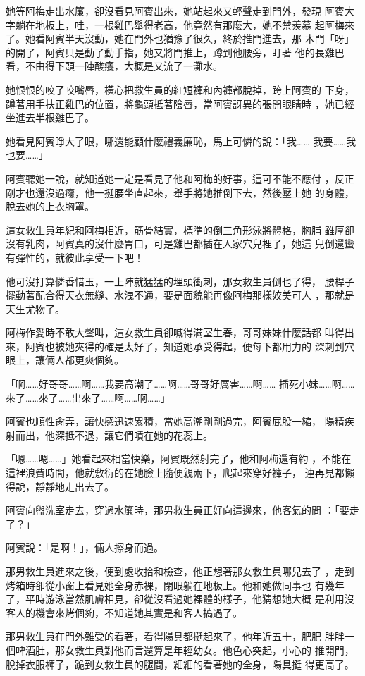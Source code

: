 她等阿梅走出水簾，卻沒看見阿賓出來，她站起來又輕聲走到門外，發現
阿賓大字躺在地板上，哇，一根雞巴舉得老高，他竟然有那麼大，她不禁羨慕
起阿梅來了。她看阿賓半天沒動，她在門外也猶豫了很久，終於推門進去，那
木門「呀」的開了，阿賓只是動了動手指，她又將門推上，蹲到他腰旁，盯著
他的長雞巴看，不由得下頭一陣酸癢，大概是又流了一灘水。

她恨恨的咬了咬嘴唇，橫心把救生員的紅短褲和內褲都脫掉，跨上阿賓的
下身，蹲著用手扶正雞巴的位置，將龜頭抵著陰唇，當阿賓訝異的張開眼睛時
，她已經坐進去半根雞巴了。

她看見阿賓睜大了眼，哪還能顧什麼禮義廉恥，馬上可憐的說：「我……
我要……我也要……」

阿賓聽她一說，就知道她一定是看見了他和阿梅的好事，這可不能不應付
，反正剛才也還沒過癮，他一挺腰坐直起來，舉手將她推倒下去，然後壓上她
的身體，脫去她的上衣胸罩。

這女救生員年紀和阿梅相近，筋骨結實，標準的倒三角形泳將體格，胸脯
雖厚卻沒有乳肉，阿賓真的沒什麼胃口，可是雞巴都插在人家穴兒裡了，她這
兒倒還蠻有彈性的，就彼此享受一下吧！

他可沒打算憐香惜玉，一上陣就猛猛的埋頭衝刺，那女救生員倒也了得，
腰桿子擺動著配合得天衣無縫、水洩不通，要是面貌能再像阿梅那樣姣美可人
，那就是天生尤物了。

阿梅作愛時不敢大聲叫，這女救生員卻喊得滿室生春，哥哥妹妹什麼話都
叫得出來，阿賓也被她夾得的確是太好了，知道她承受得起，便每下都用力的
深刺到穴眼上，讓倆人都更爽個夠。

「啊……好哥哥……啊……我要高潮了……啊……哥哥好厲害……啊……
插死小妹……啊……來了……來了……出來了……啊……啊……」

阿賓也順性肏弄，讓快感迅速累積，當她高潮剛剛過完，阿賓屁股一縮，
陽精疾射而出，他深抵不退，讓它們噴在她的花蕊上。

「嗯……嗯……」她看起來相當快樂，阿賓既然射完了，他和阿梅還有約
，不能在這裡浪費時間，他就敷衍的在她臉上隨便親兩下，爬起來穿好褲子，
連再見都懶得說，靜靜地走出去了。

阿賓向盥洗室走去，穿過水簾時，那男救生員正好向這邊來，他客氣的問
：「要走了？」

阿賓說：「是啊！」，倆人擦身而過。

那男救生員進來之後，便到處收拾和檢查，他正想著那女救生員哪兒去了
，走到烤箱時卻從小窗上看見她全身赤裸，閉眼躺在地板上。他和她做同事也
有幾年了，平時游泳當然肌膚相見，卻從沒看過她裸體的樣子，他猜想她大概
是利用沒客人的機會來烤個夠，不知道她其實是和客人搞過了。

那男救生員在門外難受的看著，看得陽具都挺起來了，他年近五十，肥肥
胖胖一個啤酒肚，那女救生員對他而言還算是年輕幼女。他色心突起，小心的
推開門，脫掉衣服褲子，跪到女救生員的腿間，細細的看著她的全身，陽具挺
得更高了。

